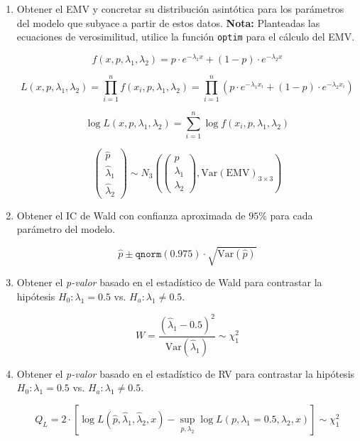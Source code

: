 \begin{enumerate}
    \item Obtener el EMV y concretar su distribución asintótica para los parámetros del modelo que subyace a partir de estos datos.
    \textbf{Nota:} Planteadas las ecuaciones de verosimilitud, utilice la función \texttt{optim} para el cálculo del EMV.

    \[
    f(x, p, \lambda_1, \lambda_2) = p \cdot e^{-\lambda_1 x} + (1-p) \cdot e^{-\lambda_2 x}
    \]

    \[
    L(x, p, \lambda_1, \lambda_2) = \prod_{i=1}^{n} f(x_i, p, \lambda_1, \lambda_2) = \prod_{i=1}^{n} \left( p \cdot e^{-\lambda_1 x_i} + (1-p) \cdot e^{-\lambda_2 x_i} \right)
    \]

    \[
    \log L(x, p, \lambda_1, \lambda_2) = \sum_{i=1}^{n} \log f(x_i, p, \lambda_1, \lambda_2)
    \]

    \[
    \begin{pmatrix}
        \widehat{p} \\
        \widehat{\lambda}_1 \\
        \widehat{\lambda}_2
    \end{pmatrix}
    \sim
    N_3
    \left(
    \begin{pmatrix}
        p \\
        \lambda_1 \\
        \lambda_2
    \end{pmatrix},
    \text{Var}(\text{EMV})_{3 \times 3}
    \right)
    \]

    \item Obtener el IC de Wald con confianza aproximada de \(95\%\) para cada parámetro del modelo.

    \[
    \widehat{p} \pm \texttt{qnorm}(0.975) \cdot \sqrt{\text{Var}(\widehat{p})}
    \]

    \item Obtener el \textit{p-valor} basado en el estadístico de Wald para contrastar la hipótesis \(H_0: \lambda_1 = 0.5\) vs. \(H_a: \lambda_1 \neq 0.5\).

    \[
    W = \frac{(\widehat{\lambda}_1 - 0.5)^2}{\text{Var}(\widehat{\lambda}_1)} \sim \chi^2_1
    \]

    \item Obtener el \textit{p-valor} basado en el estadístico de RV para contrastar la hipótesis \(H_0: \lambda_1 = 0.5\) vs. \(H_a: \lambda_1 \neq 0.5\).

    \[
    Q_L = 2 \cdot \left[ \log L(\widehat{p}, \widehat{\lambda}_1, \widehat{\lambda}_2, x) - \sup_{p, \lambda_2} \log L(p, \lambda_1 = 0.5, \lambda_2, x) \right] \sim \chi^2_1
    \]

\end{enumerate}
